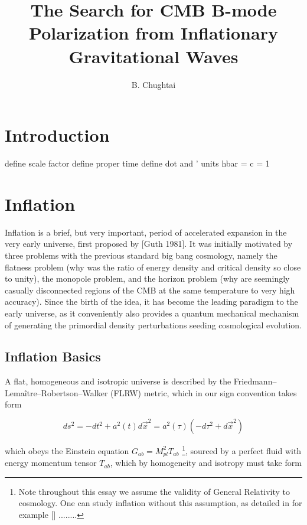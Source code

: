\documentclass[a4paper,11pt]{article}
\title{\boldmath The Search for CMB B-mode Polarization from Inflationary Gravitational Waves}
\author{B. Chughtai}
\affiliation{University of Cambridge, Cambridge, UK}
\newcommand{\Mp}{M_{pl}}
\begin{document}
\maketitle
\flushbottom


\section{Introduction}

define scale factor
define proper time
define dot and '
units hbar = c = 1

\section{Inflation}

Inflation is a brief, but very important, period of accelerated expansion in the very early universe, first proposed by [Guth 1981]. It was initially motivated by three problems with the previous standard big bang cosmology, namely the flatness problem (why was the ratio of energy density and critical density so close to unity), the monopole problem, and the horizon problem (why are seemingly casually disconnected regions of the CMB at the same temperature to very high accuracy). Since the birth of the idea, it has become the leading paradigm to the early universe, as it conveniently also provides a quantum mechanical mechanism of generating the primordial density perturbations seeding cosmological evolution.

\subsection{Inflation Basics}

A flat, homogeneous and isotropic universe is described by the Friedmann–Lemaître–Robertson–Walker (FLRW) metric, which in our sign convention takes form

\begin{equation}
\label{FLRW}
ds^2 = - dt^2 + a^2(t)d\vec{x}^2 = a^2(\tau)(-d\tau^2+d\vec{x}^2)
\end{equation}

which obeys the Einstein equation $G_{ab} = \Mp^2 T_{ab}$ \footnote{Note throughout this essay we assume the validity of General Relativity to cosmology. One can study inflation without this assumption, as detailed in for example [] ........}, sourced by a perfect fluid with energy momentum tensor $T_{ab}$, which by homogeneity and isotropy must take form
\end{document}
